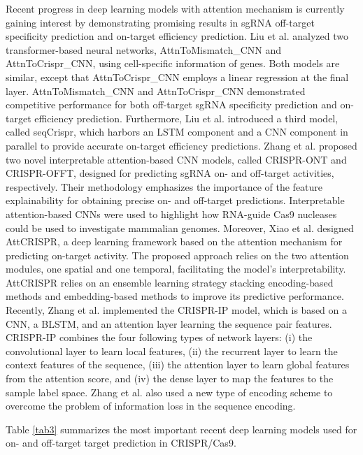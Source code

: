 \documentclass[unnumsec,webpdf,contemporary,large]{oup-authoring-template}
\theoremstyle{thmstyleone}%
\theoremstyle{thmstyletwo}%
\theoremstyle{thmstylethree}%
\begin{document}
Recent progress in deep learning models with attention mechanism \cite{vaswani2017attention} is currently gaining interest by demonstrating promising results in sgRNA off-target specificity prediction and on-target efficiency prediction. Liu et al. \cite{liu2019prediction} analyzed two transformer-based neural networks, AttnToMismatch\_CNN and AttnToCrispr\_CNN, using cell-specific information of genes. Both models are similar, except that AttnToCrispr\_CNN employs a linear regression at the final layer. AttnToMismatch\_CNN and AttnToCrispr\_CNN demonstrated competitive performance for both off-target sgRNA specificity prediction and on-target efficiency prediction. Furthermore, Liu et al. introduced a third model, called seqCrispr, which harbors an LSTM component and a CNN component in parallel to provide accurate on-target efficiency predictions. Zhang et al. \cite{zhang2021prediction} proposed two novel interpretable attention-based CNN models, called CRISPR-ONT and CRISPR-OFFT, designed for predicting sgRNA on- and off-target activities, respectively. Their methodology emphasizes the importance of the feature explainability for obtaining precise on- and off-target predictions. Interpretable attention-based CNNs were used to highlight how RNA-guide Cas9 nucleases could be used to investigate mammalian genomes. Moreover, Xiao et al. \cite{xiao2021attcrispr} designed AttCRISPR, a deep learning framework based on the attention mechanism for predicting on-target activity. The proposed approach relies on the two attention modules, one spatial and one temporal, facilitating the model's interpretability. AttCRISPR relies on an ensemble learning strategy stacking encoding-based methods and embedding-based methods to improve its predictive performance. Recently, Zhang et al. \cite{zhang2022effective} implemented the CRISPR-IP model, which is based on a CNN, a BLSTM, and an attention layer learning the sequence pair features. CRISPR-IP combines the four following types of network layers: (i) the convolutional layer to learn local features, (ii) the recurrent layer to learn the context features of the sequence, (iii) the attention layer to learn global features from the attention score, and (iv) the dense layer to map the features to the sample label space. Zhang et al. also used a new type of encoding scheme to overcome the problem of information loss in the sequence encoding.

Table \ref{tab3} summarizes the most important recent deep learning models used for on- and off-target target prediction in CRISPR/Cas9. 
\end{document}
